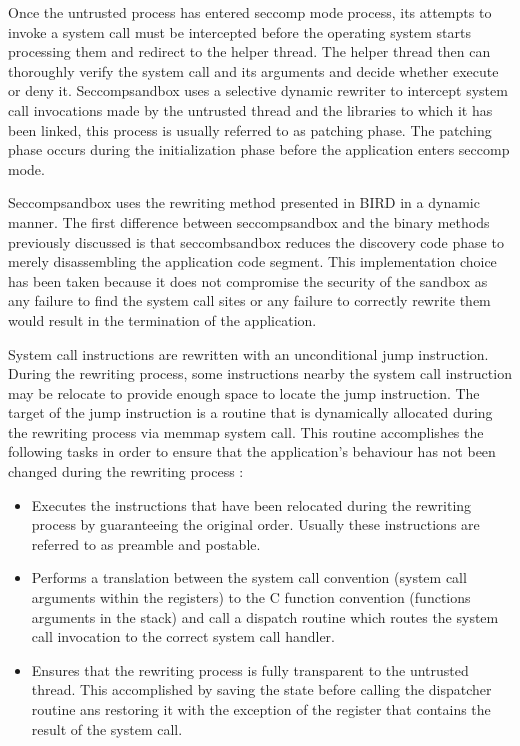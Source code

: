 Once the untrusted process has entered seccomp mode process, its attempts to invoke a system call must be intercepted before the operating system starts processing them and redirect to the helper thread. The helper thread then can thoroughly verify the system call and its arguments and decide whether execute or deny it. Seccompsandbox  uses a selective dynamic rewriter to intercept system call invocations made by the untrusted thread and the libraries to which it has been linked, this process is usually referred to as patching phase. The patching phase occurs during the initialization phase before the application enters seccomp mode. 

Seccompsandbox uses the rewriting method presented in BIRD \cite{BIRD} in a dynamic manner. The first difference between seccompsandbox and the binary methods previously discussed is that seccombsandbox reduces the discovery code phase to merely disassembling the application code segment. This implementation choice has been taken because it does not compromise the security of the sandbox as any failure to find the system call sites or any failure to correctly rewrite them would result in the termination of the application. 

System call instructions are rewritten with an unconditional jump instruction.  During the rewriting process, some instructions nearby the system call instruction may be relocate to provide enough space to locate the jump instruction. The target of the jump instruction is a routine that is dynamically allocated during the rewriting process via memmap system call. This routine accomplishes the following tasks in order to ensure that the application's behaviour has not been changed during the rewriting process :

\begin{itemize}
\item Executes the instructions that have been relocated during the rewriting process by guaranteeing the original order. Usually these instructions are referred to as preamble 		  and postable. 
\item Performs a translation between the system call convention (system call arguments within the registers) to the C function convention (functions arguments in the stack)   	  		  and call a dispatch routine which routes the system call invocation to the correct system call handler. 
\item Ensures that the rewriting process is fully transparent to the untrusted thread. This accomplished by saving the state before calling the dispatcher routine ans restoring 
	  it with the exception of the register that contains the result of the system call. 
\end{itemize}

